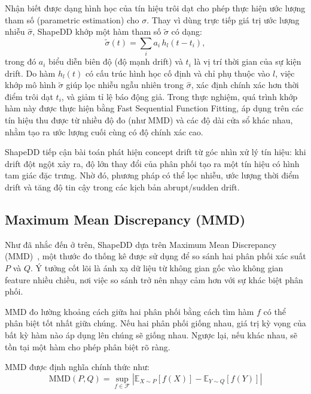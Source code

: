 Nhận biết được dạng hình học của tín hiệu trôi dạt cho phép thực hiện ước lượng tham số (parametric estimation) cho $\sigma$.
Thay vì dùng trực tiếp giá trị ước lượng nhiễu $\hat{\sigma}$, ShapeDD khớp một hàm tham số $\tilde{\sigma}$ có dạng:
\begin{equation}
	\tilde{\sigma}(t) = \sum_i a_i \, h_l(t - t_i),
\end{equation}
trong đó $a_i$ biểu diễn biên độ (độ mạnh drift) và $t_i$ là vị trí thời gian của sự kiện drift.
Do hàm $h_l(t)$ có cấu trúc hình học cố định và chỉ phụ thuộc vào $l$, việc khớp mô hình $\tilde{\sigma}$ giúp lọc nhiễu ngẫu nhiên trong $\hat{\sigma}$, xác định chính xác hơn thời điểm trôi dạt $t_i$, và giảm tỉ lệ báo động giả. Trong thực nghiệm, quá trình khớp hàm này được thực hiện bằng Fast Sequential Function Fitting, áp dụng trên các tín hiệu thu được từ nhiều
độ đo (như MMD) và các độ dài cửa sổ khác nhau, nhằm tạo ra ước lượng cuối cùng có độ chính xác cao.

ShapeDD tiếp cận bài toán phát hiện concept drift từ góc nhìn xử lý tín hiệu: khi drift đột ngột xảy ra, độ lớn thay đổi của phân phối tạo ra một tín hiệu có hình tam giác đặc trưng. Nhờ đó, phương pháp có thể lọc nhiễu, ước lượng thời điểm drift và tăng độ tin cậy trong các kịch bản abrupt/sudden drift.

\subsection{Maximum Mean Discrepancy (MMD)}

Như đã nhắc đến ở trên, ShapeDD dựa trên Maximum Mean Discrepancy (MMD)~\cite{gretton2012kernel}, một thước đo thống kê được sử dụng để so sánh hai phân phối xác suất $P$ và $Q$. Ý tưởng cốt lõi là ánh xạ dữ liệu từ không gian gốc vào không gian feature nhiều chiều, nơi việc so sánh trở nên nhạy cảm hơn với sự khác biệt phân phối.

MMD đo lường khoảng cách giữa hai phân phối bằng cách tìm hàm $f$ có thể phân biệt tốt nhất giữa chúng. Nếu hai phân phối giống nhau, giá trị kỳ vọng của bất kỳ hàm nào áp dụng lên chúng sẽ giống nhau. Ngược lại, nếu khác nhau, sẽ tồn tại một hàm cho phép phân biệt rõ ràng.

MMD được định nghĩa chính thức như:
\begin{equation}
	\text{MMD}(P, Q) = \sup_{f \in \mathcal{F}} \left| \mathbb{E}_{X \sim P}[f(X)] - \mathbb{E}_{Y \sim Q}[f(Y)] \right|
\end{equation}

